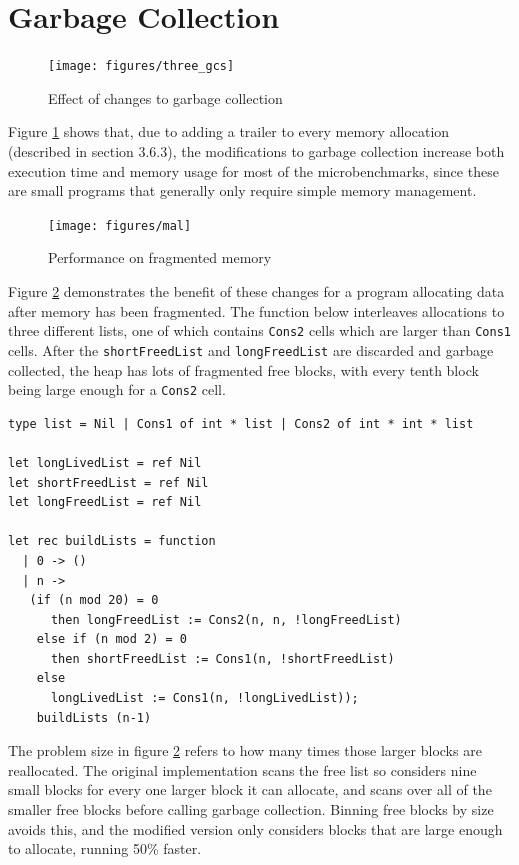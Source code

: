 


\section{Garbage Collection}

\begin{figure}[H]
\hspace{-3.3cm}
\vspace{-0.5cm}
\texttt{[image: figures/three\_gcs]}
\vspace{-0.3cm}
\caption{Effect of changes to garbage collection}
 \label{fig:three_gcs} 
\end{figure}

Figure \ref{fig:three_gcs} shows that, due to adding a trailer to every memory allocation (described in section 3.6.3), the modifications to garbage collection increase both execution time and memory usage for most of the microbenchmarks, since these are small programs that generally only require simple memory management. 

\begin{figure}[H]
\hfill \texttt{[image: figures/mal]} \hfill
\caption{Performance on fragmented memory}
 \label{fig:mal} 
\end{figure}

Figure \ref{fig:mal} demonstrates the benefit of these changes for a program allocating data after memory has been fragmented. The function below interleaves allocations to three different lists, one of which contains \verb|Cons2| cells which are larger than \verb|Cons1| cells. After the \verb|shortFreedList| and \verb|longFreedList| are discarded and garbage collected, the heap has lots of fragmented free blocks, with every tenth block being large enough for a \verb|Cons2| cell. 
\begin{verbatim}
type list = Nil | Cons1 of int * list | Cons2 of int * int * list

let longLivedList = ref Nil
let shortFreedList = ref Nil
let longFreedList = ref Nil

let rec buildLists = function
  | 0 -> ()
  | n ->
   (if (n mod 20) = 0
      then longFreedList := Cons2(n, n, !longFreedList)
    else if (n mod 2) = 0
      then shortFreedList := Cons1(n, !shortFreedList)
    else 
      longLivedList := Cons1(n, !longLivedList));
    buildLists (n-1)
\end{verbatim}
The problem size in figure \ref{fig:mal} refers to how many times those larger blocks are reallocated. The original implementation scans the free list so considers nine small blocks for every one larger block it can allocate, and scans over all of the smaller free blocks before calling garbage collection. Binning free blocks by size avoids this, and the modified version only considers blocks that are large enough to allocate, running 50\% faster. 

